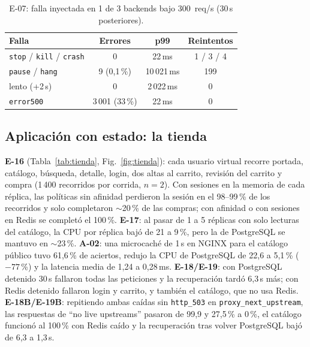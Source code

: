 \documentclass[conference]{IEEEtran}
\begin{document}
\begin{table}[t]
\caption{E-07: falla inyectada en 1 de 3 backends bajo 300~req/s (30\,s posteriores).}
\label{tab:fallas}
\centering\scriptsize
\begin{tabular}{lccc}
\toprule
Falla & Errores & p99 & Reintentos\\
\midrule
\texttt{stop} / \texttt{kill} / \texttt{crash} & 0 & 22\,ms & 1 / 3 / 4\\
\texttt{pause} / \texttt{hang} & 9 (0,1\,\%) & 10\,021\,ms & 199\\
lento (+2\,s) & 0 & 2\,022\,ms & 0\\
\texttt{error500} & 3\,001 (33\,\%) & 22\,ms & 0\\
\bottomrule
\end{tabular}
\end{table}

\subsection{Aplicación con estado: la tienda}
\textbf{E-16} (Tabla~\ref{tab:tienda}, Fig.~\ref{fig:tienda}): cada usuario virtual recorre portada, catálogo, búsqueda, detalle, login, dos altas al carrito, revisión del carrito y compra (1\,400 recorridos por corrida, $n=2$). Con sesiones en la memoria de cada réplica, las políticas sin afinidad perdieron la sesión en el 98--99\,\% de los recorridos y solo completaron $\sim$20\,\% de las compras; con afinidad o con sesiones en Redis se completó el 100\,\%. \textbf{E-17}: al pasar de 1 a 5 réplicas con solo lecturas del catálogo, la CPU por réplica bajó de 21 a 9\,\%, pero la de PostgreSQL se mantuvo en $\sim$23\,\%. \textbf{A-02}: una microcaché de 1\,s en NGINX para el catálogo público tuvo 61,6\,\% de aciertos, redujo la CPU de PostgreSQL de 22,6 a 5,1\,\% ($-77$\,\%) y la latencia media de 1,24 a 0,28\,ms. \textbf{E-18/E-19}: con PostgreSQL detenido 30\,s fallaron todas las peticiones y la recuperación tardó 6,3\,s más; con Redis detenido fallaron login y carrito, y también el catálogo, que no usa Redis. \textbf{E-18B/E-19B}: repitiendo ambas caídas sin \texttt{http\_503} en \texttt{proxy\_next\_upstream}, las respuestas de ``no live upstreams'' pasaron de 99,9 y 27,5\,\% a 0\,\%, el catálogo funcionó al 100\,\% con Redis caído y la recuperación tras volver PostgreSQL bajó de 6,3 a 1,3\,s.
\end{document}
